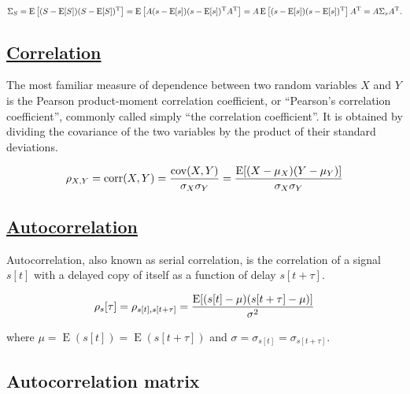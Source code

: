 \begin{equation}
  \Sigma_S = \operatorname{E} \left[
       (S - \operatorname{E}[S])
       (S - \operatorname{E}[S])^{\rm T}
    \right] = \operatorname{E} \left[
       A(s - \operatorname{E}[s])
       (s - \operatorname{E}[s])^{\rm T}A^{\rm T}
    \right] = 
    A \operatorname{E} \left[
       (s - \operatorname{E}[s])
       (s - \operatorname{E}[s])^{\rm T}
    \right] A^{\rm T} = 
    A\Sigma_sA^{\rm T}.
\end{equation}

    \hypertarget{correlation}{%
\subsection{\texorpdfstring{\href{https://en.wikipedia.org/wiki/Correlation_and_dependence}{Correlation}}{Correlation}}\label{correlation}}

The most familiar measure of dependence between two random variables
\(X\) and \(Y\) is the Pearson product-moment correlation coefficient,
or ``Pearson's correlation coefficient'', commonly called simply ``the
correlation coefficient''. It is obtained by dividing the covariance of
the two variables by the product of their standard deviations.

\begin{equation}
  \rho_{X,Y}=\mathrm{corr}(X,Y)={\mathrm{cov}(X,Y) \over \sigma_X \sigma_Y} ={\operatorname{E}[(X-\mu_X)(Y-\mu_Y)] \over \sigma_X\sigma_Y}
\end{equation}

    \hypertarget{autocorrelation}{%
\subsection{\texorpdfstring{\href{https://en.wikipedia.org/wiki/Autocorrelation}{Autocorrelation}}{Autocorrelation}}\label{autocorrelation}}

Autocorrelation, also known as serial correlation, is the correlation of
a signal \(s[t]\) with a delayed copy of itself as a function of delay
\(s[t+\tau]\).

\begin{equation}
  \rho_s[\tau]=\rho_{s[t],s[t+\tau]}={\operatorname{E}[(s[t]-\mu)(s[t+\tau]-\mu)] \over \sigma^2}
\end{equation}

where \(\mu=\operatorname{E}(s[t])=\operatorname{E}(s[t+\tau])\) and
\(\sigma=\sigma_{s[t]}=\sigma_{s[t+\tau]}\).

    \hypertarget{autocorrelation-matrix}{%
\subsection{Autocorrelation matrix}\label{autocorrelation-matrix}}

